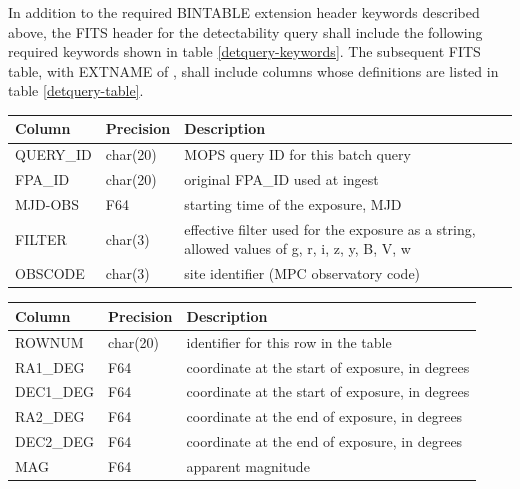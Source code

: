 \documentclass[panstarrs,spec]{panstarrs}
\begin{document}
In addition to the required BINTABLE extension header keywords
described above, the FITS header for the detectability query shall
include the following required keywords shown in table
\ref{detquery-keywords}.  The subsequent FITS table, with EXTNAME of
, shall include columns whose
definitions are listed in table \ref{detquery-table}.

{\centering%
\small
\begin{tabular}{lll}
\hline
\hline
{\bf Column}            & {\bf Precision} & {\bf Description} \\
\hline
QUERY\_ID  & char(20) & MOPS query ID for this batch query \\
FPA\_ID    & char(20) & original FPA\_ID used at ingest \\
MJD-OBS    & F64 & starting time of the exposure, MJD \\
FILTER     & char(3) & effective filter used for the exposure as a string, allowed values of g, r, i, z, y, B, V, w \\
OBSCODE    & char(3) & site identifier (MPC observatory code) \\
\end{tabular}
}


{\centering%
\small
{}
\begin{tabular}{lll}
\hline
\hline
{\bf Column}            & {\bf Precision} & {\bf Description} \\
\hline
ROWNUM      & char(20) & identifier for this row in the table \\
RA1\_DEG    & F64 & coordinate at the start of exposure, in degrees \\
DEC1\_DEG   & F64 & coordinate at the start of exposure, in degrees \\
RA2\_DEG    & F64 & coordinate at the end of exposure, in degrees \\
DEC2\_DEG   & F64 & coordinate at the end of exposure, in degrees \\
MAG         & F64 & apparent magnitude \\
\end{tabular}
}
\end{document}
